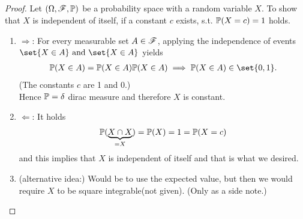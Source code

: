 \subsection{}
\begin{proof} Let $(\Omega, \mathscr{F}, \mathbb{P})$ be a probability space with a random variable $X$. To show that $X$ is independent of itself, if a constant $c$ exists, s.t. $\mathbb{P}(X =c) = 1$ holds.
	\begin{enumerate}
		\item $\Longrightarrow$:
		For every measurable set $A \in \mathscr{F}$, applying the independence of events $\set{X \in A} \and \set{X \in A}$ yields
		\begin{align*}
		\meas(X \in A) = \meas(X \in A)\meas(X \in A) \implies \meas(X \in A) \in \set{0,1}.
		\end{align*}
		(The constants $c$ are 1 and 0.)\\
		Hence $\mathbb{P} = \delta$ dirac measure and therefore $X$ is constant.
		\item $\Longleftarrow$: It holds
		\begin{align*}
		\mathbb{P}(\underbrace{X \cap X}_{=X}) = \mathbb{P}(X) = 1 = \mathbb{P}(X=c)
		\end{align*}
		and this implies that $X$ is independent of itself and that is what we desired.
		\item (alternative idea:) Would be to use the expected value, but then we would require $X$ to be square integrable(not given). (Only as a side note.)
	\end{enumerate}
\end{proof}
